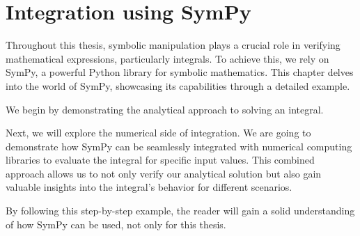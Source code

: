 \chapter{Integration using SymPy}\label{ch:intsympy}

Throughout this thesis, symbolic manipulation plays a crucial role in verifying mathematical expressions, particularly integrals.
To achieve this, we rely on SymPy\autocite{10.7717/peerj-cs.103}, a powerful Python library for symbolic mathematics.
This chapter delves into the world of SymPy, showcasing its capabilities through a detailed example.

We begin by demonstrating the analytical approach to solving an integral.

Next, we will explore the numerical side of integration.
We are going to demonstrate how SymPy can be seamlessly integrated with numerical computing libraries to evaluate the integral for specific input values.
This combined approach allows us to not only verify our analytical solution but also gain valuable insights into the integral's behavior for different scenarios.

By following this step-by-step example, the reader will gain a solid understanding of how SymPy can be used, not only for this thesis.




